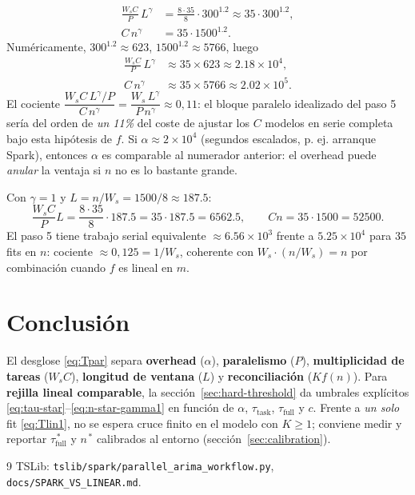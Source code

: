 \documentclass[11pt,a4paper]{article}
\begin{document}
\begin{align*}
  \frac{W_s C}{P}\, L^\gamma
  &= \frac{8 \cdot 35}{8} \cdot 300^{1.2}
   \approx 35 \cdot 300^{1.2} , \\
  C\, n^\gamma &= 35 \cdot 1500^{1.2} .
\end{align*}
Numéricamente, $300^{1.2} \approx 623$, $1500^{1.2}\approx 5766$, luego
\begin{align*}
  \frac{W_s C}{P}\, L^\gamma &\approx 35 \times 623 \approx 2.18\times 10^4, \\
  C\, n^\gamma &\approx 35 \times 5766 \approx 2.02\times 10^5 .
\end{align*}
El cociente $\dfrac{W_s C\, L^\gamma / P}{C\, n^\gamma}
= \dfrac{W_s\, L^\gamma}{P\, n^\gamma} \approx 0{,}11$: el bloque paralelo
idealizado del paso 5 sería del orden de \emph{un 11\%} del coste de ajustar
los $C$ modelos en serie completa bajo esta hipótesis de $f$. Si
$\alpha \approx 2\times 10^4$ (segundos escalados, p. ej. arranque Spark),
entonces $\alpha$ es comparable al numerador anterior: el overhead puede
\emph{anular} la ventaja si $n$ no es lo bastante grande.

Con $\gamma=1$ y $L=n/W_s=1500/8\approx 187.5$:
\begin{equation*}
  \frac{W_s C}{P} L = \frac{8\cdot 35}{8}\cdot 187.5 = 35\cdot 187.5 = 6562.5,
  \qquad
  C n = 35\cdot 1500 = 52500 .
\end{equation*}
El paso 5 tiene trabajo serial equivalente $\approx 6.56\times 10^3$ frente a
$5.25\times 10^4$ para $35$ fits en $n$: cociente $\approx 0{,}125 = 1/W_s$,
coherente con $W_s\cdot (n/W_s)=n$ por combinación cuando $f$ es lineal en $m$.

\section{Conclusión}

El desglose \eqref{eq:Tpar} separa \textbf{overhead} ($\alpha$),
\textbf{paralelismo} ($P$), \textbf{multiplicidad de tareas} ($W_s C$),
\textbf{longitud de ventana} ($L$) y \textbf{reconciliación} ($K f(n)$). Para
\textbf{rejilla lineal comparable}, la sección~\ref{sec:hard-threshold} da umbrales explícitos
\eqref{eq:tau-star}--\eqref{eq:n-star-gamma1} en función de $\alpha$,
$\tau_{\mathrm{task}}$, $\tau_{\mathrm{full}}$ y $c$. Frente a \emph{un solo} fit
\eqref{eq:Tlin1}, no se espera cruce finito en el modelo con $K\ge 1$; conviene
medir y reportar $\tau_{\mathrm{full}}^{\,*}$ y $n^{\,*}$ calibrados al entorno
(sección~\ref{sec:calibration}).

\begin{thebibliography}{9}
  TSLib: \texttt{tslib/spark/parallel\_arima\_workflow.py},
  \texttt{docs/SPARK\_VS\_LINEAR.md}.
\end{thebibliography}
\end{document}

